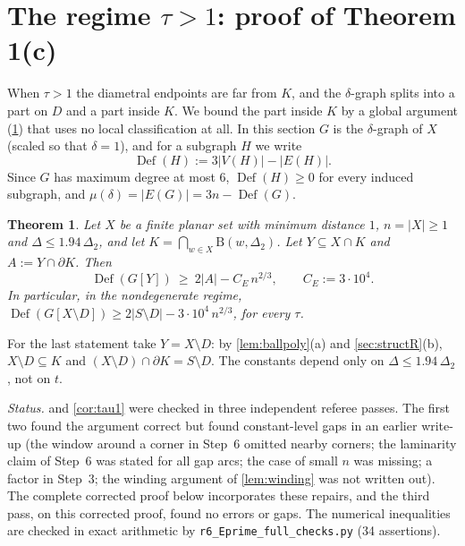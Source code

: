\documentclass[11pt]{amsart}
\newtheorem{theorem}{Theorem}[section]
\theoremstyle{definition}
\theoremstyle{remark}
\newcommand{\Dt}{\Delta_2}
\newcommand{\mult}{\mu}
\newcommand{\Dd}{\mathrm{B}}      %
\begin{document}
\section{The regime \texorpdfstring{$\tau>1$}{tau > 1}: proof of Theorem 1(c)}\label{sec:Eprime}

When $\tau>1$ the diametral endpoints are far from $K$, and the $\delta$-graph splits into a part on $D$ and a part inside $K$. We bound the part inside $K$ by a global argument (\cref{thm:Eprime}) that uses no local classification at all. In this section $G$ is the $\delta$-graph of $X$ (scaled so that $\delta=1$), and for a subgraph $H$ we write
\[
\operatorname{Def}(H):=3|V(H)|-|E(H)| .
\]
Since $G$ has maximum degree at most $6$, $\operatorname{Def}(H)\ge0$ for every induced subgraph, and $\mult(\delta)=|E(G)|=3n-\operatorname{Def}(G)$.

\begin{theorem}\label{thm:Eprime}
Let $X$ be a finite planar set with minimum distance $1$, $n=|X|\ge1$ and $\Delta\le1.94\,\Dt$, and let $K=\bigcap_{w\in X}\Dd(w,\Dt)$. Let $Y\subseteq X\cap K$ and $A:=Y\cap\partial K$. Then
\[
\operatorname{Def}(G[Y])\ \ge\ 2|A|-C_E\,n^{2/3},\qquad C_E:=3\cdot10^4 .
\]
In particular, in the nondegenerate regime, $\operatorname{Def}(G[X\setminus D])\ge2|S\setminus D|-3\cdot10^4\,n^{2/3}$, for every $\tau$.
\end{theorem}
For the last statement take $Y=X\setminus D$: by \cref{lem:ballpoly}(a) and \cref{sec:structR}(b), $X\setminus D\subseteq K$ and $(X\setminus D)\cap\partial K=S\setminus D$. The constants depend only on $\Delta\le1.94\,\Dt$, not on $t$.

\emph{Status.}  and \cref{cor:tau1} were checked in three independent referee passes. The first two found the argument correct but found constant-level gaps in an earlier write-up (the window around a corner in Step~6 omitted nearby corners; the laminarity claim of Step~6 was stated for all gap arcs; the case of small $n$ was missing; a factor in Step~3; the winding argument of \cref{lem:winding} was not written out). The complete corrected proof below incorporates these repairs, and the third pass, on this corrected proof, found no errors or gaps. The numerical inequalities are checked in exact arithmetic by \texttt{r6\_Eprime\_full\_checks.py} (34 assertions).
\end{document}
